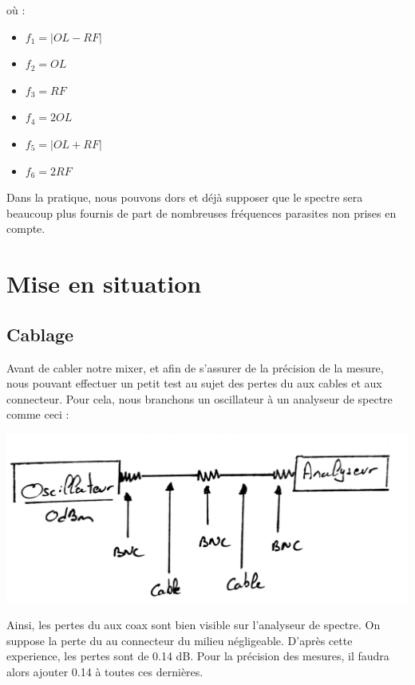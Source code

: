 \documentclass[a4paper,12pt]{report}            %
\begin{document}
où : 
\begin{itemize}
    \item $f_{1} = |OL-RF|$
    \item $f_{2} = OL$ 
    \item $f_{3} = RF$
    \item $f_{4} = 2OL$
    \item $f_{5} = |OL+RF|$
    \item $f_{6} = 2RF$
\end{itemize}


\bigskip
Dans la pratique, nous pouvons dors et déjà supposer que le spectre sera beaucoup
plus fournis de part de nombreuses fréquences parasites non prises en compte.

\chapter{Mise en situation}
\section{Cablage}

Avant de cabler notre mixer, et afin de s'assurer de la précision de la mesure, 
nous pouvant effectuer un petit test au sujet des pertes du aux cables et aux connecteur.
Pour cela, nous branchons un oscillateur à un analyseur de spectre comme ceci :\\
\begin{center}\includegraphics[scale = 0.2]{pic/mesure_perte.png}\\ \end{center}

    Ainsi, les pertes du aux coax sont bien visible sur l'analyseur de spectre. On suppose
la perte du au connecteur du milieu négligeable. D'après cette experience, les pertes sont de
0.14 dB. Pour la précision des mesures, il faudra alors ajouter 0.14 à toutes ces dernières.
\end{document}
